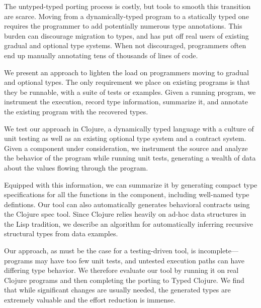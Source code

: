 %


The untyped-typed porting process is costly, but tools to smooth
this transition are scarce.  Moving from a dynamically-typed program
to a statically typed one requires the programmer to add potentially
numerous type annotations. This burden can discourage migration to
types, and has put off real users of existing gradual and optional
type systems. When not discouraged, programmers often end up
manually annotating tens of thousands of lines of code.

We present an approach to lighten the load on programmers moving to
gradual and optional types. The only requirement we place on existing
programs is that they be runnable, with a suite of tests or
examples. Given a running program, we instrument the execution, record
type information, summarize it, and annotate the existing program with
the recovered types.

We test our approach in Clojure, a dynamically typed
language with a culture of unit testing as well as an  existing
optional type system and a contract system. Given a component under
consideration, we instrument the source and analyze the behavior of the
program while running unit tests, generating a wealth of data about
the values flowing through the program.

Equipped with this information, we can summarize it by generating compact
type specifications for all the functions in the component, including
well-named type defintions. Our tool can also automatically generates
behavioral contracts using the Clojure spec tool. Since Clojure relies
heavily on ad-hoc data structures in the Lisp tradition, we describe
an algorithm for automatically inferring recursive structural types
from data examples.

Our approach, as must be the case for a testing-driven tool, is
incomplete---programs may have too few unit tests, and untested
execution paths can have differing type behavior. We therefore
evaluate our tool by running it on real Clojure programs and then
completing the porting to Typed Clojure. We find that while
significant changes are usually needed, the generated types are
extremely valuable and the effort reduction is immense.

